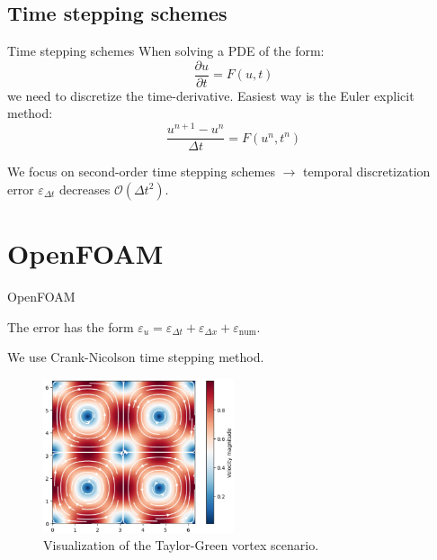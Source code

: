 \documentclass[
  english,            %
  aspectratio=43,    %
]{tumbeamer}
\begin{document}
\subsection{Time stepping schemes}
\begin{frame}{Time stepping schemes}
When solving a PDE of the form:
\begin{equation}
    \frac{\partial u}{\partial t} = F(u, t)
\end{equation}
we need to discretize the time-derivative. Easiest way is the Euler explicit method: \\
\begin{equation}
    \frac{u^{n+1} - u^n}{\Delta t} = {F}(u^{n}, t^{n})
\end{equation}

\vspace{10pt}

We focus on second-order time stepping schemes $\rightarrow$ temporal discretization error $\varepsilon_{\Delta t}$ decreases $\mathcal{O}(\Delta t^2)$. \\



\end{frame}

\section{OpenFOAM}
\begin{frame}{OpenFOAM}

The error has the form $\varepsilon_u = \varepsilon_{\Delta t} + \varepsilon_{\Delta x} + \varepsilon_\text{num}$.
\vspace{10pt}

We use Crank-Nicolson time stepping method.

\vspace*{\fill}

    \begin{figure}
        \centering
        \includegraphics[width=0.5\textwidth]{resources/taylor-green-vortex.png}
        \caption{Visualization of the Taylor-Green vortex scenario.}
    \end{figure}
\end{frame}
\end{document}
